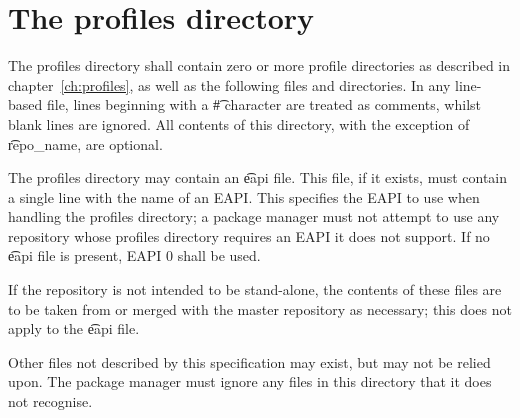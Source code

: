 \section{The profiles directory}
\label{sec:profiles-dir}

The profiles directory shall contain zero or more profile directories as described in
chapter~\ref{ch:profiles}, as well as the following files and directories. In any line-based file,
lines beginning with a \t{\#} character are treated as comments, whilst blank lines are ignored.
All contents of this directory, with the exception of \t{repo_name}, are optional.

The profiles directory may contain an \t{eapi} file. This file, if it exists, must contain a single
line with the name of an EAPI\@. This specifies the EAPI to use when handling the profiles
directory; a package manager must not attempt to use any repository whose profiles directory
requires an EAPI it does not support. If no \t{eapi} file is present, EAPI 0 shall be used.

If the repository is not intended to be stand-alone, the contents of these files are to be taken
from or merged with the master repository as necessary; this does not apply to the \t{eapi} file.

Other files not described by this specification may exist, but may not be relied upon. The package
manager must ignore any files in this directory that it does not recognise.

